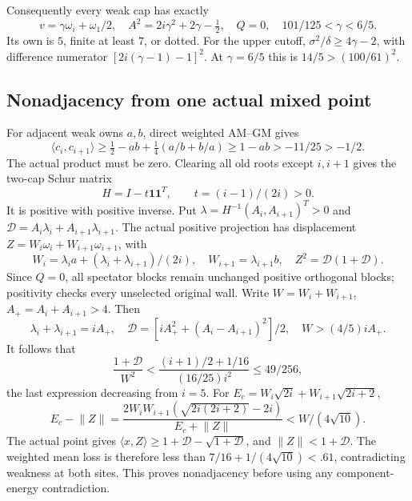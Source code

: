 \documentclass[11pt]{article}
\theoremstyle{definition}
\theoremstyle{remark}
\newcommand{\ip}[2]{\langle #1,#2\rangle}
\newcommand{\norm}[1]{\lVert #1\rVert}
\begin{document}
Consequently every weak cap has exactly
\begin{equation}\label{app:eq:pureprefix}
 v=\gamma\omega_i+\omega_1/2,\quad
 A^2=2i\gamma^2+2\gamma-\tfrac12,\quad Q=0,\quad
 101/125<\gamma<6/5.
\end{equation}
Its own is \(5\), finite at least \(7\), or dotted.
For the upper cutoff,
\(\sigma^2/\delta\geq4\gamma-2\), with difference
numerator \([2i(\gamma-1)-1]^2\).
At \(\gamma=6/5\) this is
\(14/5>(100/61)^2\).

\subsection{Nonadjacency from one actual mixed point}
For adjacent weak owns \(a,b\), direct weighted AM--GM gives
\[
 \ip{c_i}{c_{i+1}}\geq
 \tfrac12-ab+\tfrac14(a/b+b/a)
 \geq1-ab>-11/25>-1/2.
\]
The actual product must be zero. Clearing all old roots
except \(i,i+1\) gives the two-cap Schur matrix
\[
 H=I-t\mathbf1\mathbf1^T,\qquad t=(i-1)/(2i)>0.
\]
It is positive with positive inverse. Put
\(\lambda=H^{-1}(A_i,A_{i+1})^T>0\) and
\(\mathcal D=A_i\lambda_i+A_{i+1}\lambda_{i+1}\).
The actual positive projection has displacement
\(Z=W_i\omega_i+W_{i+1}\omega_{i+1}\), with
\[
 W_i=\lambda_i a+(\lambda_i+\lambda_{i+1})/(2i),
 \quad W_{i+1}=\lambda_{i+1}b,\quad
 Z^2=\mathcal D(1+\mathcal D).
\]
Since \(Q=0\), all spectator blocks remain unchanged
positive orthogonal blocks; positivity checks every
unselected original wall.
Write \(W=W_i+W_{i+1}\), \(A_+=A_i+A_{i+1}>4\).
Then
\[
 \lambda_i+\lambda_{i+1}=iA_+,\quad
 \mathcal D=[iA_+^2+(A_i-A_{i+1})^2]/2,\quad
 W>(4/5)iA_+.
\]
It follows that
\[
 \frac{1+\mathcal D}{W^2}
 <\frac{(i+1)/2+1/16}{(16/25)i^2}
 \leq49/256,
\]
the last expression decreasing from \(i=5\).
For \(E_c=W_i\sqrt{2i}+W_{i+1}\sqrt{2i+2}\),
\[
 E_c-\norm Z=
 \frac{2W_iW_{i+1}(\sqrt{2i(2i+2)}-2i)}
      {E_c+\norm Z}<W/(4\sqrt{10}).
\]
The actual point gives
\(\ip{x}{Z}\geq1+\mathcal D-\sqrt{1+\mathcal D}\),
and \(\norm Z<1+\mathcal D\).
The weighted mean loss is therefore less than
\(7/16+1/(4\sqrt{10})<.61\), contradicting weakness
at both sites. This proves nonadjacency before using
any component-energy contradiction.
\end{document}
